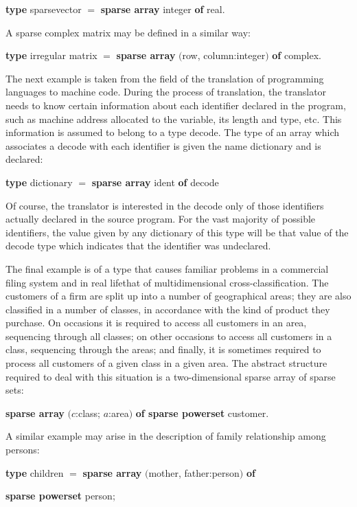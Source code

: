 \quad \textbf{type} sparsevector $=$ \textbf{sparse array} integer \textbf{of} real.

\noindent
A sparse complex matrix may be defined in a similar way:

\quad \textbf{type} irregular matrix $=$ \textbf{sparse array} $($row, column:integer$)$ \textbf{of} complex.

The next example is taken from the field of the translation of programming languages to machine code. During the process of translation, the translator needs to know certain information about each identifier declared in the program, such as machine address allocated to the variable, its length and type, etc. This information is assumed to belong to a type decode. The type of an array which associates a decode with each identifier is given the name dictionary and is declared:

\quad \textbf{type} dictionary $=$ \textbf{sparse array} ident \textbf{of} decode

\noindent
Of course, the translator is interested in the decode only of those identifiers actually declared in the source program. For the vast majority of possible identifiers, the value given by any dictionary of this type will be that value of the decode type which indicates that the identifier was undeclared.

The final example is of a type that causes familiar problems in a commercial filing system and in real life\textemdash{}that of multidimensional cross-classification. The customers of a firm are split up into a number of geographical areas; they are also classified in a number of classes, in accordance with the kind of product they purchase. On occasions it is required to access all customers in an area, sequencing through all classes; on other occasions to access all customers in a class, sequencing through the areas; and finally, it is sometimes required to process all customers of a given class in a given area. The abstract structure required to deal with this situation is a two-dimensional sparse array of sparse sets:

\quad \textbf{sparse array} $(c$:class; $a$:area$)$ \textbf{of sparse powerset} customer.

A similar example may arise in the description of family relationship among persons:

\quad \textbf{type} children $=$ \textbf{sparse array} $($mother, father:person$)$ \textbf{of} 

\tabto*{9.2em}\textbf{sparse powerset} person;

